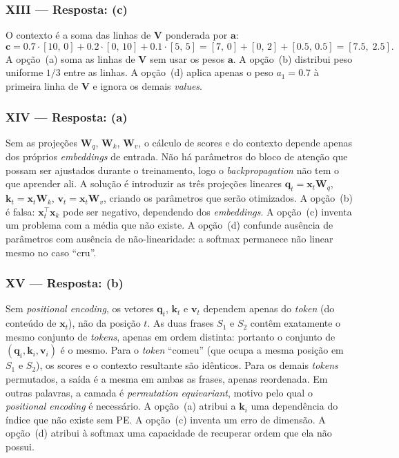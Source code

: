 \documentclass{dlproblemset}
\begin{document}
\subsubsection*{XIII — Resposta: (c)}
O contexto é a soma das linhas de $\mathbf{V}$ ponderada por $\mathbf{a}$:
\[
  \mathbf{c} = 0.7 \cdot [10,\,0] + 0.2 \cdot [0,\,10] + 0.1 \cdot [5,\,5]
    = [7,\,0] + [0,\,2] + [0.5,\,0.5]
    = [7.5,\;2.5].
\]
A opção~(a) soma as linhas de $\mathbf{V}$ sem usar os pesos $\mathbf{a}$. A opção~(b)
distribui peso uniforme $1/3$ entre as linhas. A opção~(d) aplica apenas
o peso $a_1 = 0.7$ à primeira linha de $\mathbf{V}$ e ignora os demais
\textit{values}.

\subsubsection*{XIV — Resposta: (a)}
Sem as projeções $\mathbf{W}_q$, $\mathbf{W}_k$, $\mathbf{W}_v$, o cálculo de scores e do contexto
depende apenas dos próprios \textit{embeddings} de entrada. Não há
parâmetros do bloco de atenção que possam ser ajustados durante o
treinamento, logo o \textit{backpropagation} não tem o que aprender ali.
A solução é introduzir as três projeções lineares $\mathbf{q}_t = \mathbf{x}_t \mathbf{W}_q$,
$\mathbf{k}_t = \mathbf{x}_t \mathbf{W}_k$, $\mathbf{v}_t = \mathbf{x}_t \mathbf{W}_v$, criando os parâmetros que serão
otimizados.
A opção~(b) é falsa: $\mathbf{x}_t^\top \mathbf{x}_k$ pode ser negativo, dependendo dos
\textit{embeddings}. A opção~(c) inventa um problema com a média que
não existe. A opção~(d) confunde ausência de parâmetros com ausência de
não-linearidade: a softmax permanece não linear mesmo no caso ``cru''.

\subsubsection*{XV — Resposta: (b)}
Sem \textit{positional encoding}, os vetores $\mathbf{q}_t$, $\mathbf{k}_t$ e $\mathbf{v}_t$
dependem apenas do \textit{token} (do conteúdo de $\mathbf{x}_t$), não da posição
$t$. As duas frases $S_1$ e $S_2$ contêm exatamente o mesmo conjunto de
\textit{tokens}, apenas em ordem distinta: portanto o conjunto de
$(\mathbf{q}_i, \mathbf{k}_i, \mathbf{v}_i)$ é o mesmo. Para o \textit{token} ``comeu'' (que ocupa
a mesma posição em $S_1$ e $S_2$), os scores e o contexto resultante são
idênticos. Para os demais \textit{tokens} permutados, a saída é a mesma
em ambas as frases, apenas reordenada. Em outras palavras, a camada é
\emph{permutation equivariant}, motivo pelo qual o \textit{positional
encoding} é necessário.
A opção~(a) atribui a $\mathbf{k}_i$ uma dependência do índice que não existe sem
PE. A opção~(c) inventa um erro de dimensão. A opção~(d) atribui à
softmax uma capacidade de recuperar ordem que ela não possui.
\end{document}
